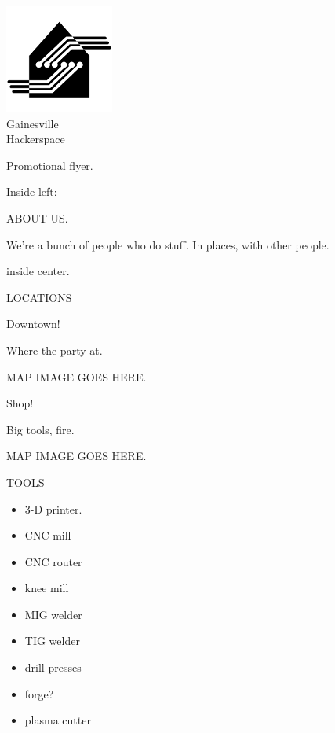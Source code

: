 \documentclass{leaflet}
\begin{document}
\begin{center} 
\includegraphics[scale=0.6]{logos/logo.png} \\
\Large
Gainesville\\
Hackerspace\\


\normalsize
\end{center}

Promotional flyer.


\newpage

Inside left:

ABOUT US.

We're a bunch of people who do stuff.  In places, with other people.




\newpage

inside center.

LOCATIONS

\Large Downtown! 

\normalsize

Where the party at.


MAP IMAGE GOES HERE.



\Large Shop!

\normalsize

Big tools, fire.


MAP IMAGE GOES HERE.


\newpage


TOOLS

\begin{itemize}

\item 3-D printer.

\item CNC mill

\item CNC router

\item knee mill

\item MIG welder

\item TIG welder

\item drill presses

\item forge?

\item plasma cutter


\end{itemize}
\end{document}
